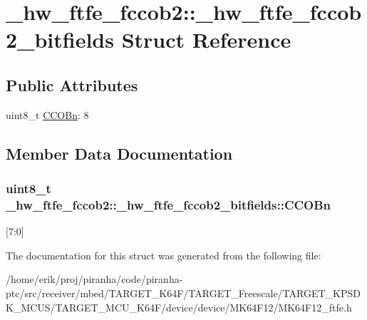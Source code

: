 \hypertarget{struct__hw__ftfe__fccob2_1_1__hw__ftfe__fccob2__bitfields}{}\section{\+\_\+hw\+\_\+ftfe\+\_\+fccob2\+:\+:\+\_\+hw\+\_\+ftfe\+\_\+fccob2\+\_\+bitfields Struct Reference}
\label{struct__hw__ftfe__fccob2_1_1__hw__ftfe__fccob2__bitfields}
\subsection*{Public Attributes}
\begin{DoxyCompactItemize}
\item 
uint8\+\_\+t \hyperlink{struct__hw__ftfe__fccob2_1_1__hw__ftfe__fccob2__bitfields_a7f585190473daa83d09ed25e69394c0d}{C\+C\+O\+Bn}\+: 8
\end{DoxyCompactItemize}


\subsection{Member Data Documentation}
\subsubsection[{\texorpdfstring{C\+C\+O\+Bn}{CCOBn}}]{\setlength{\rightskip}{0pt plus 5cm}uint8\+\_\+t \+\_\+hw\+\_\+ftfe\+\_\+fccob2\+::\+\_\+hw\+\_\+ftfe\+\_\+fccob2\+\_\+bitfields\+::\+C\+C\+O\+Bn}\hypertarget{struct__hw__ftfe__fccob2_1_1__hw__ftfe__fccob2__bitfields_a7f585190473daa83d09ed25e69394c0d}{}\label{struct__hw__ftfe__fccob2_1_1__hw__ftfe__fccob2__bitfields_a7f585190473daa83d09ed25e69394c0d}
\mbox{[}7\+:0\mbox{]} 

The documentation for this struct was generated from the following file\+:\begin{DoxyCompactItemize}
\item 
/home/erik/proj/piranha/code/piranha-\/ptc/src/receiver/mbed/\+T\+A\+R\+G\+E\+T\+\_\+\+K64\+F/\+T\+A\+R\+G\+E\+T\+\_\+\+Freescale/\+T\+A\+R\+G\+E\+T\+\_\+\+K\+P\+S\+D\+K\+\_\+\+M\+C\+U\+S/\+T\+A\+R\+G\+E\+T\+\_\+\+M\+C\+U\+\_\+\+K64\+F/device/device/\+M\+K64\+F12/M\+K64\+F12\+\_\+ftfe.\+h\end{DoxyCompactItemize}
